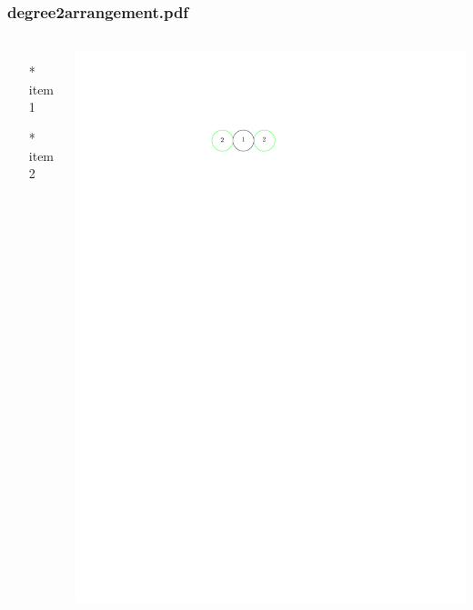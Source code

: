\begin{frame} \frametitle{degree2arrangement.pdf}
    \begin{columns}[c]
        \begin{itemize}
            \item[*] item 1
            \item[*] item 2
        \end{itemize}
        \begin{minipage}{\linewidth}
            \begin{center}
            \includegraphics[width=.9\textwidth]{graphics/degree2arrangement.pdf}
            \label{gfx:degree2arrangement.pdf}
            \end{center}
        \end{minipage}
    \end{columns}
\end{frame}
